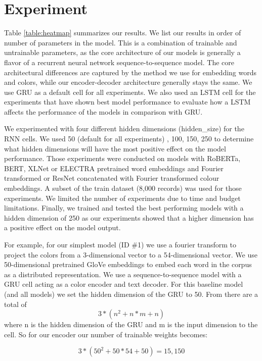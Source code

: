 \section{Experiment}

Table \ref{table:heatmap} summarizes our results. We list our results in order of number of parameters in the model. This is a combination of trainable and untrainable parameters, as the core architecture of our models is generally a flavor of a recurrent neural network sequence-to-sequence model. The core architectural differences are captured by the method we use for embedding words and colors, while our encoder-decoder architecture generally stays the same. We use GRU as a default cell for all experiments. We also used an LSTM cell for the experiments that have shown best model performance to evaluate how a LSTM affects the performance of the models in comparison with GRU.

\par
We experimented with four different hidden dimensions (hidden\_size) for the RNN cells. We used 50 (default for all experiments) , 100, 150, 250 to determine what hidden dimensions will have the most positive effect on the model performance. Those experiments were conducted on models with RoBERTa, BERT, XLNet or ELECTRA pretrained word embeddings and Fourier transformed or ResNet concatenated with Fourier transformed colour embeddings. A subset of the train dataset (8,000 records) was used for those experiments. We limited the number of experiments due to time and budget limitations. Finally, we trained and tested the best performing models with a hidden dimension of 250 as our experiments showed that a higher dimension has a positive effect on the model output.

\par
For example, for our simplest model (ID \#1) we use a fourier transform to project the colors from a 3-dimensional vector to a 54-dimensional vector. We use 50-dimensional pretrained GloVe embeddings to embed each word in the corpus as a distributed representation. We use a sequence-to-sequence model with a GRU cell acting as a color encoder and text decoder.  For this baseline model (and all models) we set the hidden dimension of the GRU to 50. From \citep{dey-2017-gru} there are a total of \[3*(n^2 + n*m +n)\] where n is the hidden dimension of the GRU and m is the input dimension to the cell. So for our encoder our number of trainable weights becomes:

\[3*(50^2 + 50*54 +50) = 15,150\]

